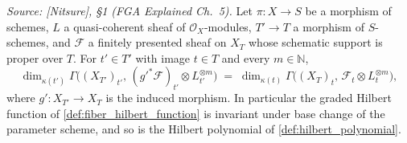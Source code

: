 \begin{lemma}
  \label{lem:hilbert_fibre_base_change}
  \textit{Source: [Nitsure], \S 1 (FGA Explained Ch.~5).}
  Let \(\pi : X \to S\) be a morphism of schemes, \(L\) a quasi-coherent
  sheaf of \(\mathcal{O}_X\)-modules, \(T' \to T\) a morphism of
  \(S\)-schemes, and
  \(\mathcal{F}\) a finitely presented sheaf on \(X_T\) whose schematic
  support is proper over \(T\).  For \(t' \in T'\) with image \(t \in T\)
  and every \(m \in \mathbb{N}\),
  \[
    \dim_{\kappa(t')} \Gamma\bigl((X_{T'})_{t'},\,
      (g'^*\mathcal{F})_{t'} \otimes L_{t'}^{\otimes m}\bigr)
    \;=\;
    \dim_{\kappa(t)} \Gamma\bigl((X_T)_t,\,
      \mathcal{F}_t \otimes L_t^{\otimes m}\bigr),
  \]
  where \(g' : X_{T'} \to X_T\) is the induced morphism.  In particular the
  graded Hilbert function of \cref{def:fiber_hilbert_function} is invariant
  under base change of the parameter scheme, and so is the Hilbert polynomial
  of \cref{def:hilbert_polynomial}.
\end{lemma}
